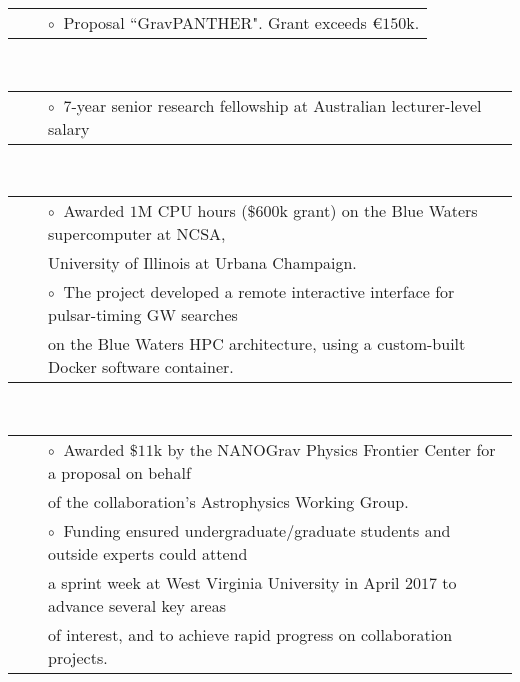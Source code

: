 \documentclass[11pt,letterpaper,sans]{moderncv}
\begin{document}
\begin{tabular}{rcl}
&\hspace{0.4cm} &{\color{color1} $\circ\;\;$}Proposal ``GravPANTHER". Grant exceeds \euro$150$k.
\end{tabular} \\
\begin{tabular}{rcl}
&\hspace{0.4cm} &{\color{color1} $\circ\;\;$}$7$-year senior research fellowship at Australian lecturer-level salary 
\end{tabular} \\
\begin{tabular}{rcl}
&\hspace{0.4cm} &{\color{color1} $\circ\;\;$}Awarded $1$M CPU hours ($\$600$k grant) on the Blue Waters supercomputer at NCSA, \\
&\hspace{0.4cm} &  \hspace{0.4cm}University of Illinois at Urbana Champaign. \\
&\hspace{0.4cm} &{\color{color1} $\circ\;\;$}The project developed a remote interactive interface for pulsar-timing GW searches \\
&\hspace{0.4cm} &  \hspace{0.4cm}on the Blue Waters HPC architecture, using a custom-built Docker software container.
\end{tabular} \\
\begin{tabular}{rcl}
&\hspace{0.4cm} &{\color{color1} $\circ\;\;$}Awarded $\$11$k by the NANOGrav Physics Frontier Center for a proposal on behalf \\
&\hspace{0.4cm} &  \hspace{0.4cm}of the collaboration's Astrophysics Working Group. \\
&\hspace{0.4cm} &{\color{color1} $\circ\;\;$}Funding ensured undergraduate/graduate students and outside experts could attend \\
&\hspace{0.4cm} &  \hspace{0.4cm}a sprint week at West Virginia University in April $2017$ to advance several key areas \\
&\hspace{0.4cm} &  \hspace{0.4cm}of interest, and to achieve rapid progress on collaboration projects. 
\end{tabular} \\
\end{document}
